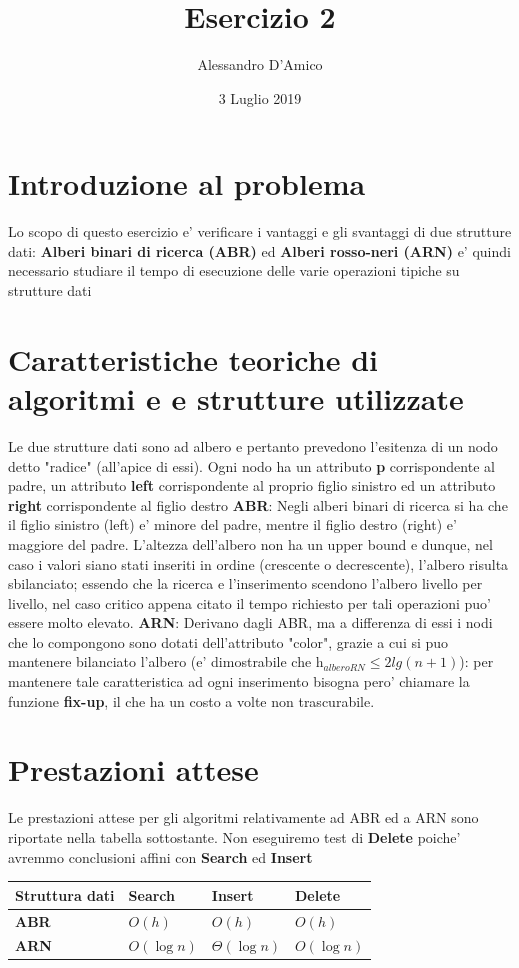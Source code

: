 \documentclass[a4paper]{article}
\title {{\TitleFont Esercizio 2}}
\date{3 Luglio 2019}
\author{{\AuthFont Alessandro D'Amico}}
\begin{document}
\begin{titlingpage}
\maketitle
\end{titlingpage}
\tableofcontents
\newpage
\section{Introduzione al problema}
Lo scopo di questo esercizio e' verificare i vantaggi e gli svantaggi di due strutture dati: \textbf{Alberi binari di ricerca (ABR)} ed \textbf{Alberi rosso-neri (ARN)} e' quindi necessario studiare il tempo di esecuzione delle varie operazioni tipiche su strutture dati
\section{Caratteristiche teoriche di algoritmi e e strutture utilizzate}
Le due strutture dati sono ad albero e pertanto prevedono l'esitenza di un nodo detto "radice" (all'apice di essi). Ogni nodo ha un attributo \textbf{p} corrispondente al padre, un attributo \textbf{left} corrispondente al proprio figlio sinistro ed un attributo \textbf{right} corrispondente al figlio destro
\newline
\textbf{ABR}: Negli alberi binari di ricerca si ha che il figlio sinistro (left) e' minore del padre, mentre il figlio destro (right) e' maggiore del padre. L'altezza dell'albero non ha un upper bound e dunque, nel caso i valori siano stati inseriti in ordine (crescente o decrescente), l'albero risulta sbilanciato; essendo che la ricerca e l'inserimento scendono l'albero livello per livello, nel caso critico appena citato il tempo richiesto per tali operazioni puo' essere molto elevato.   
\newline
\textbf{ARN}: Derivano dagli ABR, ma a differenza di essi i nodi che lo compongono sono dotati dell'attributo "color", grazie a cui si puo mantenere bilanciato l'albero (e' dimostrabile che h$_{alberoRN}\leq2lg(n+1)$): per mantenere tale caratteristica ad ogni inserimento bisogna pero' chiamare la funzione \textbf{fix-up}, il che ha un costo a volte non trascurabile.

\section{Prestazioni attese}
Le prestazioni attese per gli algoritmi relativamente ad ABR ed a ARN sono riportate nella tabella sottostante. Non eseguiremo test di \textbf{Delete} poiche' avremmo conclusioni affini con \textbf{Search} ed \textbf{Insert}	
\newline
\newline
	\begin{tabularx}{10cm}{|X|X|X|X|}
	\hline
	Struttura dati & Search & Insert & Delete  \\
	\hline
	\textbf{ABR} & $O(h)$  & $O(h)$ & $O(h)$  \\
	\hline
	\textbf{ARN} &  $O(\log{}n)$ & $\Theta(\log{}n)$ & $O(\log{}n)$\\
	\hline
	\end{tabularx}
\end{document}
